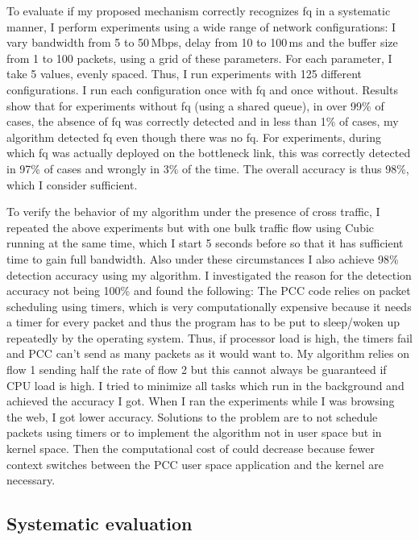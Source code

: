 \documentclass[conference]{IEEEtran}
\begin{document}
To evaluate if my proposed mechanism correctly recognizes \gls{fq} in a systematic manner, I perform experiments using a wide range of network configurations: I vary bandwidth from 5 to 50\,Mbps, delay from 10 to 100\,ms and the buffer size from 1 to 100 packets, using a grid of these parameters. For each parameter, I take 5 values, evenly spaced. Thus, I run experiments with 125 different configurations. I run each configuration once with \gls{fq} and once without. Results show that for experiments without \gls{fq} (using a shared queue), in over 99\% of cases, the absence of \gls{fq} was correctly detected and in less than 1\% of cases, my algorithm detected \gls{fq} even though there was no \gls{fq}. For experiments, during which \gls{fq} was actually deployed on the bottleneck link, this was correctly detected in 97\% of cases and wrongly in 3\% of the time. The overall accuracy is thus 98\%, which I consider sufficient. 

To verify the behavior of my algorithm under the presence of cross traffic, I repeated the above experiments but with one bulk traffic flow using Cubic running at the same time, which I start 5 seconds before so that it has sufficient time to gain full bandwidth. Also under these circumstances I also achieve 98\% detection accuracy using my algorithm. I investigated the reason for the detection accuracy not being 100\% and found the following: The PCC code relies on packet scheduling using timers, which is very computationally expensive because it needs a timer for every packet and thus the program has to be put to sleep/woken up repeatedly by the operating system. Thus, if processor load is high, the timers fail and PCC can't send as many packets as it would want to. My algorithm relies on flow 1 sending half the rate of flow 2 but this cannot always be guaranteed if CPU load is high. I tried to minimize all tasks which run in the background and achieved the accuracy I got. When I ran the experiments while I was browsing the web, I got lower accuracy. Solutions to the problem are to not schedule packets using timers or to implement the algorithm not in user space but in kernel space. Then the computational cost of could decrease because fewer context switches between the PCC user space application and the kernel are necessary. 

\subsection{Systematic evaluation}
 
\end{document}
